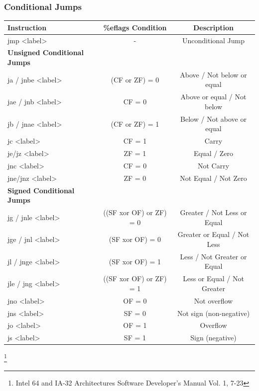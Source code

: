\documentclass[11pt,xcolor=dvipsnames]{beamer}
\begin{document}
\begin{frame}[fragile,t]
\frametitle{Conditional Jumps}
\begin{table}[h]\scriptsize
\begin{tabular}{l|c|c}
  \textbf{Instruction} & \textbf{\%eflags Condition} &  \textbf{Description} \\
  \hline
  {\ttfamily jmp <label>} & - & Unconditional Jump \\
  \textbf{Unsigned Conditional Jumps} & & \\
  \hline
  {\ttfamily ja / jnbe <label>} & (CF or ZF) = 0 & Above / Not below or equal \\
  {\ttfamily jae / jnb <label>} & CF = 0 & Above or equal / Not below \\
  {\ttfamily jb / jnae <label>} & (CF or ZF) = 1 & Below / Not above or equal \\
  {\ttfamily jc <label>} & CF = 1 & Carry \\
  {\ttfamily je/jz <label>} & ZF = 1 & Equal / Zero \\
  {\ttfamily jnc <label>} & CF = 0 & Not Carry \\
  {\ttfamily jne/jnz <label>} & ZF = 0 & Not Equal / Not Zero \\
  \textbf{Signed Conditional Jumps} & & \\
  \hline
  {\ttfamily jg / jnle <label>} & ((SF xor OF) or ZF) = 0 & Greater / Not Less or Equal\\
  {\ttfamily jge / jnl <label>} & (SF xor OF) = 0 & Greater or Equal / Not Less\\
  {\ttfamily jl / jnge <label>} & (SF xor OF) = 1 & Less / Not Greater or Equal \\
  {\ttfamily jle / jng <label>} & ((SF xor OF) or ZF) = 1 & Less or Equal / Not Greater \\
  {\ttfamily jno <label>} & OF = 0 & Not overflow \\
  {\ttfamily jns <label>} & SF = 0 & Not sign (non-negative) \\
  {\ttfamily jo <label>} & OF = 1 & Overflow \\
  {\ttfamily js <label>} & SF = 1 & Sign (negative) \\
\end{tabular}
\end{table} \footnote{Intel 64 and IA-32 Architectures Software Developer’s Manual Vol. 1, 7-23}
\end{frame}
\end{document}
